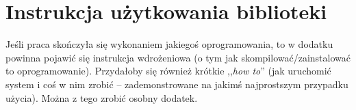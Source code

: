 \chapter{Instrukcja użytkowania biblioteki}
Jeśli praca skończyła się wykonaniem jakiegoś oprogramowania, to w dodatku powinna pojawić się instrukcja wdrożeniowa (o tym jak skompilować/zainstalować to oprogramowanie).
Przydałoby się również krótkie ,,\emph{how to}'' (jak uruchomić system i coś w nim zrobić -- zademonstrowane na jakimś najprostszym przypadku użycia). Można z tego zrobić osobny dodatek.